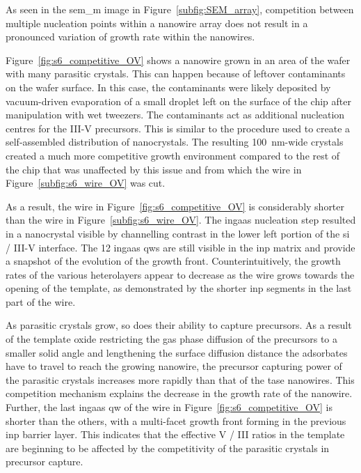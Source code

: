 As seen in the \acs{sem_m} image in Figure~\ref{subfig:SEM_array}, competition between multiple nucleation points within a nanowire array does not result in a pronounced variation of growth rate within the nanowires. 

Figure~\ref{fig:s6_competitive_OV} shows a nanowire grown in an area of the wafer with many parasitic crystals. This can happen because of leftover contaminants on the wafer surface. In this case, the contaminants were likely deposited by vacuum-driven evaporation of a small droplet left on the surface of the chip after manipulation with wet tweezers. The contaminants act as additional nucleation centres for the III-V precursors. This is similar to the procedure used to create a self-assembled distribution of nanocrystals. The resulting \qty{100}{\nano\metre}-wide crystals created a much more competitive growth environment compared to the rest of the chip that was unaffected by this issue and from which the wire in Figure~\ref{subfig:s6_wire_OV} was cut.

As a result, the wire in Figure~\ref{fig:s6_competitive_OV} is considerably shorter than the wire in Figure~\ref{subfig:s6_wire_OV}. The \acs{ingaas} nucleation step resulted in a nanocrystal visible by channelling contrast in the lower left portion of the \acs{si} / III-V interface. The \num{12} \acs{ingaas} \acl{qw}s are still visible in the \acs{inp} matrix and provide a snapshot of the evolution of the growth front. Counterintuitively, the growth rates of the various heterolayers appear to decrease as the wire grows towards the opening of the template, as demonstrated by the shorter \acs{inp} segments in the last part of the wire. 

As parasitic crystals grow, so does their ability to capture precursors. As a result of the template oxide restricting the gas phase diffusion of the precursors to a smaller solid angle and lengthening the surface diffusion distance the adsorbates have to travel to reach the growing nanowire, the precursor capturing power of the parasitic crystals increases more rapidly than that of the \acs{tase} nanowires. This competition mechanism explains the decrease in the growth rate of the nanowire. Further, the last \acs{ingaas} \acl{qw} of the wire in Figure~\ref{fig:s6_competitive_OV} is shorter than the others, with a multi-facet growth front forming in the previous \acs{inp} barrier layer. This indicates that the effective V / III ratios in the template are beginning to be affected by the competitivity of the parasitic crystals in precursor capture.

